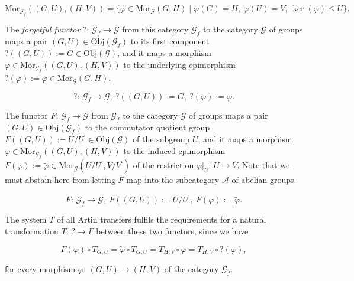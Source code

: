 \documentclass{amsart}
\theoremstyle{definition}
\numberwithin{equation}{section}
\begin{document}
\begin{equation}
\label{eqn:MorGFinInd}
\mathrm{Mor}_{\mathcal{G}_{f}}((G,U),(H,V))=\lbrace\varphi\in\mathrm{Mor}_{\mathcal{G}}(G,H)\mid\varphi(G)=H,\ \varphi(U)=V,\ \ker(\varphi)\le U\rbrace.
\end{equation}

The \textit{forgetful functor} \(?:\,\mathcal{G}_{f}\to\mathcal{G}\)
from this category \(\mathcal{G}_{f}\) to the category \(\mathcal{G}\) of groups
maps a pair \((G,U)\in\mathrm{Obj}(\mathcal{G}_{f})\) 
to its first component \(?((G,U)):=G\in\mathrm{Obj}(\mathcal{G})\),
and it maps a morphism \(\varphi\in\mathrm{Mor}_{\mathcal{G}_{f}}((G,U),(H,V))\)
to the underlying epimorphism \(?(\varphi):=\varphi\in\mathrm{Mor}_{\mathcal{G}}(G,H)\).

\begin{equation}
\label{eqn:ForgetGFinInd}
?:\,\mathcal{G}_{f}\to\mathcal{G},\ ?((G,U)):=G,\ ?(\varphi):=\varphi.
\end{equation}

The functor \(F:\,\mathcal{G}_{f}\to\mathcal{G}\)
from \(\mathcal{G}_{f}\) to the category \(\mathcal{G}\) of groups
maps a pair \((G,U)\in\mathrm{Obj}(\mathcal{G}_{f})\) 
to the commutator quotient group \(F((G,U)):=U/U^\prime\in\mathrm{Obj}(\mathcal{G})\) of the subgroup \(U\),
and it maps a morphism \(\varphi\in\mathrm{Mor}_{\mathcal{G}_{f}}((G,U),(H,V))\)
to the induced epimorphism \(F(\varphi):=\tilde{\varphi}\in\mathrm{Mor}_{\mathcal{G}}(U/U^\prime,V/V^\prime)\)
of the restriction \(\varphi\vert_U:\,U\to V\).
Note that we must abstain here from letting \(F\) map into the subcategory \(\mathcal{A}\) of abelian groups.

\begin{equation}
\label{eqn:FunctorGAster}
F:\,\mathcal{G}_{f}\to\mathcal{G},\ F((G,U)):=U/U^\prime,\ F(\varphi):=\tilde{\varphi}.
\end{equation}

\noindent
The system \(T\) of all Artin transfers fulfils the requirements for a natural transformation
\(T:\,?\to F\) between these two functors, since we have

\begin{equation}
\label{eqn:NatTransform}
F(\varphi)\circ T_{G,U}=\tilde{\varphi}\circ T_{G,U}=T_{H,V}\circ\varphi=T_{H,V}\circ ?(\varphi),
\end{equation}

\noindent
for every morphism \(\varphi:\,(G,U)\to (H,V)\) of the category \(\mathcal{G}_{f}\).
\end{document}
